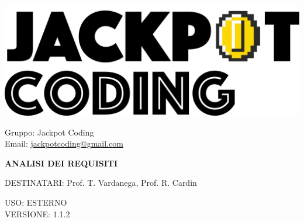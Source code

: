 \documentclass[5pt]{article}
\begin{document}
\begin{minipage}[t]{0.50\textwidth}
    \begin{flushleft}
        \hspace{10pt}
        \includegraphics[scale=0.65]{jackpot-logo.png} 
    \end{flushleft}
\end{minipage}
\hspace{-60pt} %
\begin{flushright}
    \begin{minipage}[t]{0.50\textwidth}
        \begin{flushright}
            Gruppo: {\Large Jackpot Coding}\\
            Email: \href{mailto:jackpotcoding@gmail.com}{jackpotcoding@gmail.com}
        \end{flushright}
    \end{minipage}
\end{flushright}

\vspace{24pt}

\begin{center}
    \textbf{\LARGE ANALISI DEI REQUISITI}
\end{center}

\vspace{13pt}

\begin{flushleft}
    \begin{spacing}{1.5}
        DESTINATARI: Prof. T. Vardanega, Prof. R. Cardin\\
    \end{spacing}
\end{flushleft}

\begin{flushright}
    \begin{spacing}{1}
        USO: ESTERNO\\
        VERSIONE: 1.1.2\\
    \end{spacing}
\end{flushright}
\end{document}
